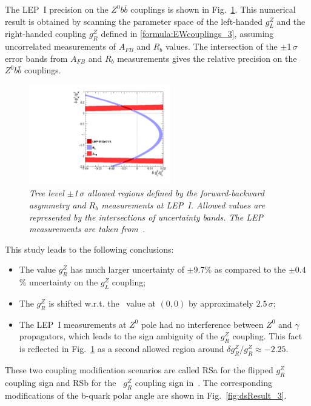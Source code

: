 The LEP~I precision on the $Z^0b\bar{b}$ couplings is shown in Fig.~\ref{fig:LEPResultFull_3}.
This numerical result is obtained by scanning the parameter space of the left-handed $g^Z_L$ and the right-handed  coupling $g^Z_R$ defined in \ref{formula:EWcouplings_3}, assuming uncorrelated measurements of $A_{FB}$ and $R_b$ values. 
The intersection of the  $\pm$1\,$\sigma$ error bands from $A_{FB}$ and $R_b$ measurements gives the relative precision on the $Z^0 b\bar{b}$ couplings.
\begin{figure}
	{\centering
		\includegraphics[width=0.55\textwidth]{ILD/plots/lep-result-full.pdf}
		\caption{\sl  Tree level $\pm$1\,$\sigma$ allowed regions defined by the forward-backward asymmetry and $R_b$ measurements at LEP~I. Allowed values are represented by the intersections of uncertainty bands. The LEP measurements are taken from~\cite{bib:RSTOP}. 
		}
		\label{fig:LEPResultFull_3}
	}
	
\end{figure}
This study leads to the following conclusions:
\begin{itemize}
	\item The value $g_R^Z$ has much larger uncertainty of $\pm$9.7\% as compared to the $\pm 0.4$\% uncertainty on the $g_L^Z$ coupling;
	\item The $g_R^Z$ is shifted w.r.t. the \sm\ value at $(0,0)$ by approximately $2.5\,\sigma$;
	\item The LEP~I measurements at $Z^0$ pole had no interference between $Z^0$ and $\gamma$ propagators, which leads to the sign ambiguity of the $g_R^Z$ coupling. This fact is reflected in Fig.~\ref{fig:LEPResultFull_3} as a second allowed region around $\delta g_R^Z / g_R^Z \approx -2.25$. 
\end{itemize}
These two coupling modification scenarios are called RSa for the flipped $g_R^Z$ coupling sign and RSb for the \sm\ $g_R^Z$ coupling sign in~\cite{bib:RSTOP}.
The corresponding modifications of the b-quark polar angle are shown in Fig.~\ref{fig:dsResult_3}.
